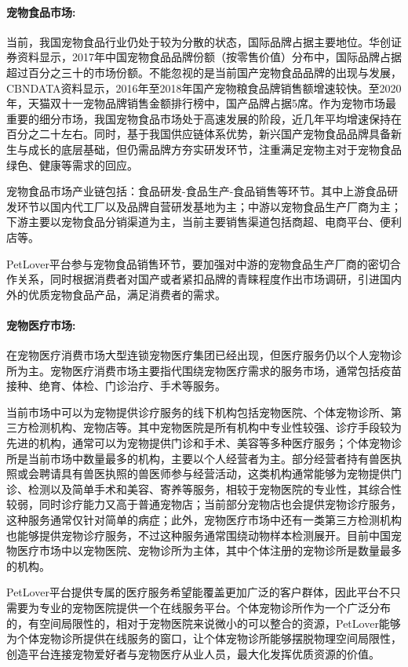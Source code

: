 \documentclass[a4paper]{ctexart}
\begin{document}
\paragraph{宠物食品市场:}

当前，我国宠物食品行业仍处于较为分散的状态，国际品牌占据主要地位。华创证券资料显示，2017年中国宠物食品品牌份额（按零售价值）分布中，国际品牌占据超过百分之三十的市场份额。不能忽视的是当前国产宠物食品品牌的出现与发展，CBNDATA资料显示，2016年至2018年国产宠物粮食品牌销售额增速较快。至2020年，天猫双十一宠物品牌销售金额排行榜中，国产品牌占据5席。作为宠物市场最重要的细分市场，我国宠物食品市场处于高速发展的阶段，近几年平均增速保持在百分之二十左右。同时，基于我国供应链体系优势，新兴国产宠物食品品牌具备新生与成长的底层基础，但仍需品牌方夯实研发环节，注重满足宠物主对于宠物食品绿色、健康等需求的回应。

宠物食品市场产业链包括：食品研发-食品生产-食品销售等环节。其中上游食品研发环节以国内代工厂以及品牌自营研发基地为主；中游以宠物食品生产厂商为主；下游主要以宠物食品分销渠道为主，当前主要销售渠道包括商超、电商平台、便利店等。

PetLover平台参与宠物食品销售环节，要加强对中游的宠物食品生产厂商的密切合作关系，同时根据消费者对国产或者紧扣品牌的青睐程度作出市场调研，引进国内外的优质宠物食品产品，满足消费者的需求。

\paragraph{宠物医疗市场:}

在宠物医疗消费市场大型连锁宠物医疗集团已经出现，但医疗服务仍以个人宠物诊所为主。宠物医疗消费市场主要指代围绕宠物医疗需求的服务市场，通常包括疫苗接种、绝育、体检、门诊治疗、手术等服务。

当前市场中可以为宠物提供诊疗服务的线下机构包括宠物医院、个体宠物诊所、第三方检测机构、宠物店等。其中宠物医院是所有机构中专业性较强、诊疗手段较为先进的机构，通常可以为宠物提供门诊和手术、美容等多种医疗服务；个体宠物诊所是当前市场中数量最多的机构，主要以个人经营者为主。部分经营者持有兽医执照或会聘请具有兽医执照的兽医师参与经营活动，这类机构通常能够为宠物提供门诊、检测以及简单手术和美容、寄养等服务，相较于宠物医院的专业性，其综合性较弱，同时诊疗能力又高于普通宠物店；当前部分宠物店也会提供宠物诊疗服务，这种服务通常仅针对简单的病症；此外，宠物医疗市场中还有一类第三方检测机构也能够提供宠物诊疗服务，不过这种服务通常围绕动物样本检测展开。目前中国宠物医疗市场中以宠物医院、宠物诊所为主体，其中个体注册的宠物诊所是数量最多的机构。

PetLover平台提供专属的医疗服务希望能覆盖更加广泛的客户群体，因此平台不只需要为专业的宠物医院提供一个在线服务平台。个体宠物诊所作为一个广泛分布的，有空间局限性的，相对于宠物医院来说微小的可以整合的资源，PetLover能够为个体宠物诊所提供在线服务的窗口，让个体宠物诊所能够摆脱物理空间局限性，创造平台连接宠物爱好者与宠物医疗从业人员，最大化发挥优质资源的价值。
\end{document}
